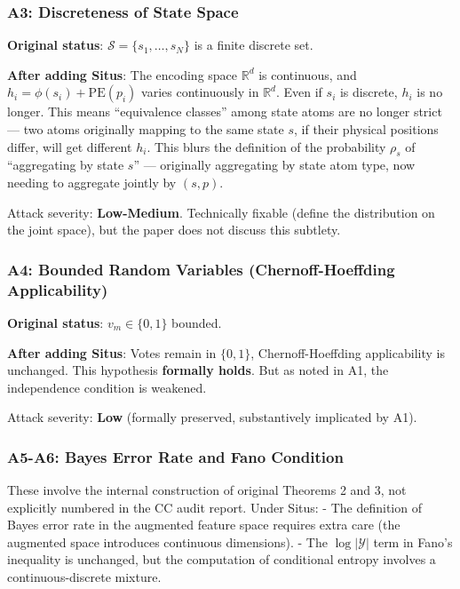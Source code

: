 \documentclass[
  12pt,
]{article}
\begin{document}
\subsubsection{A3: Discreteness of State Space}\label{a3-discreteness-state-space}

\textbf{Original status}: $\mathcal{S} = \{s_1, \ldots, s_N\}$ is a finite discrete set.

\textbf{After adding Situs}: The encoding space $\mathbb{R}^d$ is continuous, and $h_i = \phi(s_i) + \text{PE}(p_i)$ varies continuously in $\mathbb{R}^d$. Even if $s_i$ is discrete, $h_i$ is no longer. This means ``equivalence classes'' among state atoms are no longer strict --- two atoms originally mapping to the same state $s$, if their physical positions differ, will get different $h_i$. This blurs the definition of the probability $\rho_s$ of ``aggregating by state $s$'' --- originally aggregating by state atom type, now needing to aggregate jointly by $(s, p)$.

Attack severity: \textbf{Low-Medium}. Technically fixable (define the distribution on the joint space), but the paper does not discuss this subtlety.

\subsubsection{A4: Bounded Random Variables (Chernoff-Hoeffding Applicability)}\label{a4-bounded-random-variables}

\textbf{Original status}: $v_m \in \{0,1\}$ bounded.

\textbf{After adding Situs}: Votes remain in $\{0,1\}$, Chernoff-Hoeffding applicability is unchanged. This hypothesis \textbf{formally holds}. But as noted in A1, the independence condition is weakened.

Attack severity: \textbf{Low} (formally preserved, substantively implicated by A1).

\subsubsection{A5-A6: Bayes Error Rate and Fano Condition}\label{a5-a6-bayes-fano}

These involve the internal construction of original Theorems 2 and 3, not explicitly numbered in the CC audit report. Under Situs:
- The definition of Bayes error rate in the augmented feature space requires extra care (the augmented space introduces continuous dimensions).
- The $\log|\mathcal{Y}|$ term in Fano's inequality is unchanged, but the computation of conditional entropy involves a continuous-discrete mixture.
\end{document}
